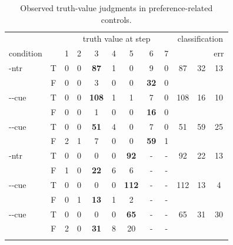 \documentclass[fleqn,reqno,10pt]{article}
\newcommand{\lc}{\acro{lc}}
\newcommand{\ec}{\acro{ec}}
\newcommand{\LC}{\lc}
\newcommand{\EC}{\ec}
\begin{document}
\begin{table}
  \centering
  \begin{tabular}{lcccccccc@{\hskip 0.6cm}ccc}
    && \multicolumn{7}{c}{truth value at step}
    & \multicolumn{3}{c}{classification}
    \\ \cmidrule(l){3-9} \cmidrule(r){10-12}
    condition &
    & 1
    & 2
    & 3
    & 4
    & 5
    & 6
    & 7
    & \lc
    & \ec
    & err \\ \midrule
    \lc-ntr 
    & T & 0 & 0 & \textbf{87} & 1 & 0 & 9 & 0 
    & 87 & 32 & 13 \\
    & F & 0 & 0 & 3 & 0 & 0 & \textbf{32} & 0 \\
    \addlinespace[0.25cm]
    \lc-\lc-cue
    & T & 0 & 0 & \textbf{108} & 1 & 1 & 7 & 0 
    & 108 & 16 & 10 \\
    & F & 0 & 0 & 1 & 0 & 0 & \textbf{16} & 0 \\
    \addlinespace[0.25cm]
    \lc-\ec-cue
    & T & 0 & 0 & \textbf{51} & 4 & 0 & 7 & 0 
    & 51 & 59 & 25 \\
    & F & 2 & 1 & 7 & 0 & 0 & \textbf{59} & 1 \\
    \addlinespace[0.25cm]
    \ec-ntr
    & T & 0 & 0 & 0 & 0 & \textbf{92} & - & - 
    & 92 & 22 & 13 \\
    & F & 1 & 0 & \textbf{22} & 6 & 6 & - & - \\
    \addlinespace[0.25cm]
    \ec-\lc-cue
    & T & 0 & 0 & 0 & 0 & \textbf{112} & - & - 
    & 112 & 13 & 4 \\
    & F & 0 & 1 & \textbf{13} & 1 & 2 & - & - \\
    \addlinespace[0.25cm]
    \ec-\ec-cue
    & T & 0 & 0 & 0 & 0 & \textbf{65} & - & - 
    & 65 & 31 & 30 \\
    & F & 2 & 0 & \textbf{31} & 8 & 20 & - & - \\
    \addlinespace[0.25cm]
    
  \end{tabular}
  \caption{Observed truth-value judgments in preference-related controls.}
  \label{tab:count_data_TF}
\end{table}







\end{document}
